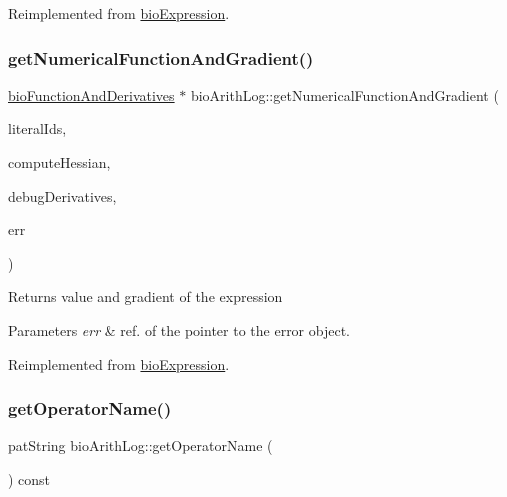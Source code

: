 Reimplemented from \hyperlink{classbio_expression_a3e4b4dca58dbbc6f0e411b30eb3f60b4}{bio\+Expression}.

\mbox{\label{classbio_arith_log_a875351accd5a515a1d3452dea45a354d}} 
\subsubsection{\texorpdfstring{get\+Numerical\+Function\+And\+Gradient()}{getNumericalFunctionAndGradient()}}
{\footnotesize\ttfamily \hyperlink{classbio_function_and_derivatives}{bio\+Function\+And\+Derivatives} $\ast$ bio\+Arith\+Log\+::get\+Numerical\+Function\+And\+Gradient (\begin{DoxyParamCaption}\item[{vector$<$ pat\+U\+Long $>$}]{literal\+Ids,  }\item[{pat\+Boolean}]{compute\+Hessian,  }\item[{pat\+Boolean}]{debug\+Derivatives,  }\item[{pat\+Error $\ast$\&}]{err }\end{DoxyParamCaption})\hspace{0.3cm}{\ttfamily [virtual]}}

\begin{DoxyReturn}{Returns}
value and gradient of the expression 
\end{DoxyReturn}

\begin{DoxyParams}{Parameters}
{\em err} & ref. of the pointer to the error object. \\
\hline
\end{DoxyParams}


Reimplemented from \hyperlink{classbio_expression_a91c81ce80c9e972c913b10f5f3c1ed13}{bio\+Expression}.

\mbox{\label{classbio_arith_log_a730e174a4e9509dccb32c3fab690a46c}} 
\subsubsection{\texorpdfstring{get\+Operator\+Name()}{getOperatorName()}}
{\footnotesize\ttfamily pat\+String bio\+Arith\+Log\+::get\+Operator\+Name (\begin{DoxyParamCaption}{ }\end{DoxyParamCaption}) const\hspace{0.3cm}{\ttfamily [virtual]}}

